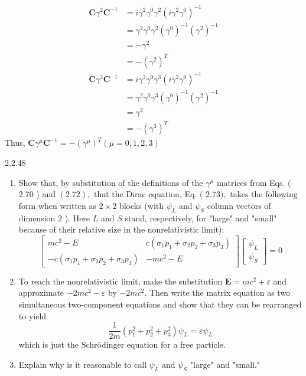 \documentclass{styles/kaobook}
\begin{document}
$$
\begin{aligned}
\mathbf{C} \gamma^{2} \mathbf{C}^{-1} &=i \gamma^{2} \gamma^{0} \gamma^{2}\left(i \gamma^{2} \gamma^{0}\right)^{-1} \\
&=\gamma^{2} \gamma^{0} \gamma^{2}\left(\gamma^{0}\right)^{-1}\left(\gamma^{2}\right)^{-1} \\
&=-\gamma^{2} \\
&=-\left(\gamma^{2}\right)^{T} \\
\mathbf{C} \gamma^{3} \mathbf{C}^{-1} &=i \gamma^{2} \gamma^{0} \gamma^{3}\left(i \gamma^{2} \gamma^{0}\right)^{-1} \\
&=\gamma^{2} \gamma^{0} \gamma^{3}\left(\gamma^{0}\right)^{-1}\left(\gamma^{2}\right)^{-1} \\
&=\gamma^{3} \\
&=-\left(\gamma^{3}\right)^{T}
\end{aligned}
$$
Thus, $\mathbf{C} \gamma^{\mu} \mathbf{C}^{-1}=-\left(\gamma^{\mu}\right)^{T}(\mu=0,1,2,3)$



\begin{greenbox}{2.2.48}
\begin{enumerate}[$(a)$]
\item Show that, by substitution of the definitions of the $\gamma^{\mu}$ matrices from Eqs. ( 2.70 ) and $(2.72),$ that the Dirac equation, Eq. ( 2.73$),$ takes the following form when written as $2 \times 2$ blocks (with $\psi_{L}$ and $\psi_{S}$ column vectors of dimension 2 ). Here $L$ and $S$ stand, respectively, for "large" and "small" because of their relative size in the nonrelativistic limit):
$$
\begin{bmatrix}
m c^{2}-E & c\left(\sigma_{1} p_{1}+\sigma_{2} p_{2}+\sigma_{3} p_{3}\right) \\
-c\left(\sigma_{1} p_{1}+\sigma_{2} p_{2}+\sigma_{3} p_{3}\right) & -m c^{2}-E
\end{bmatrix}\begin{bmatrix}
\psi_{L} \\
\psi_{S}
\end{bmatrix}=0
$$
\item To reach the nonrelativistic limit, make the substitution $\mathbf{E}=m c^{2}+\varepsilon$ and approximate $-2 m c^{2}-\varepsilon$ by $-2 m c^{2}$. Then write the matrix equation as two simultaneous two-component equations and show that they can be rearranged to yield
$$
\frac{1}{2 m}\left(p_{1}^{2}+p_{2}^{2}+p_{3}^{2}\right) \psi_{L}=\varepsilon \psi_{L}
$$
which is just the Schrödinger equation for a free particle.
\item Explain why is it reasonable to call $\psi_{L}$ and $\psi_{S}$ "large" and "small."
\end{enumerate}
\end{greenbox}
\end{document}
